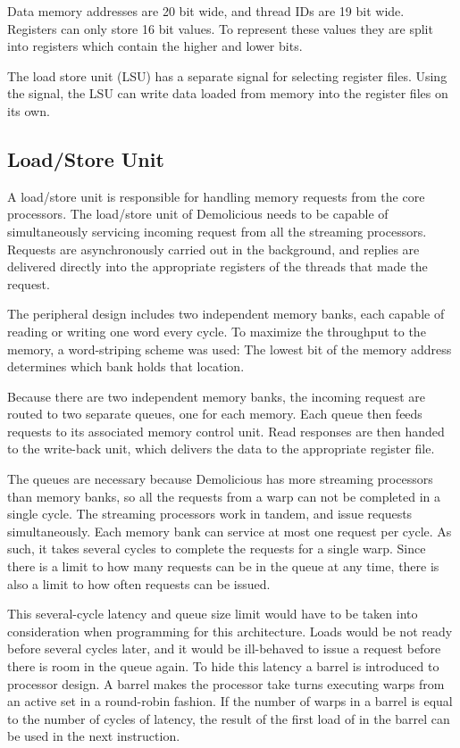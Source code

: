 \documentclass[../main/report.tex]{subfiles}
\begin{document}
Data memory addresses are 20 bit wide, and thread IDs are 19 bit wide.
Registers can only store 16 bit values.	
To represent these values they are split into registers which contain the higher and lower bits.

The load store unit (LSU) has a separate signal for selecting register files.
Using the signal, the LSU can write data loaded from memory into the register files on its own.


\subsection{Load/Store Unit}
A load/store unit is responsible for handling memory requests from the core processors.
The load/store unit of Demolicious needs to be capable of simultaneously servicing incoming request from all the streaming processors.
Requests are asynchronously carried out in the background, and replies are delivered directly into the appropriate registers of the threads that made the request.

The peripheral design includes two independent memory banks, each capable of reading or writing one word every cycle.
To maximize the throughput to the memory, a word-striping scheme was used:
The lowest bit of the memory address determines which bank holds that location.

Because there are two independent memory banks, the incoming request are routed to two separate queues, one for each memory.
Each queue then feeds requests to its associated memory control unit.
Read responses are then handed to the write-back unit, which delivers the data to the appropriate register file.

The queues are necessary because Demolicious has more streaming processors than memory banks, so all the requests from a warp can not be completed in a single cycle.
The streaming processors work in tandem, and issue requests simultaneously.
Each memory bank can service at most one request per cycle.
As such, it takes several cycles to complete the requests for a single warp.
Since there is a limit to how many requests can be in the queue at any time, there is also a limit to how often requests can be issued.

This several-cycle latency and queue size limit would have to be taken into consideration when programming for this architecture.
Loads would be not ready before several cycles later, and it would be ill-behaved to issue a request before there is room in the queue again.
To hide this latency a barrel is introduced to processor design.
A barrel makes the processor take turns executing warps from an active set in a round-robin fashion.
If the number of warps in a barrel is equal to the number of cycles of latency, the result of the first load of in the barrel can be used in the next instruction.
\end{document}
